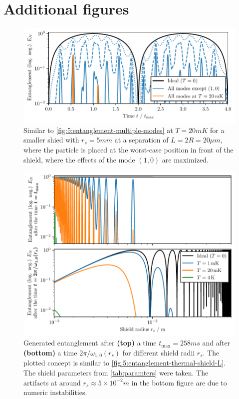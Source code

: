 \chapter{Additional figures}\label{apx:additiona-figures}
\begin{figure}[!htbp]
  \centering
  \includegraphics[width=\textwidth]{./../figures/vibrations/entanglement-dynamics-all-modes_rs-5mm.pdf}
  \caption{Similar to \cref{fig:5:entanglement-multiple-modes} at $T=20\si{mK}$ for a smaller shied with $r_s = 5\si{mm}$ at a separation of $L=2R = 20\si{\mu m}$, where the particle is placed at the worst-case position in front of the shield, where the effects of the mode $(1,0)$ are maximized.}
  \label{fig:apx:entanglement-thermal-shield-rs-5mm}
\end{figure}

\begin{figure}[!htbp]
  \centering
  \includegraphics[width=\textwidth]{./../figures/vibrations/all-modes-entanglement-rs.pdf}
  \caption{Generated entanglement after \textbf{(top)} a time $t_\mathrm{max} = 258\si{ms}$ and after \textbf{(bottom)} a time $2\pi/\omega_{1,0}(r_s)$ for different shield radii $r_s$. The plotted concept is similar to \cref{fig:5:entanglement-thermal-shield-L}. The shield parameters from \cref{tab:paramters} were taken. The artifacts at around $r_s \approx 5\times 10^{-2}\si{m}$ in the bottom figure are due to numeric instabilities.}
  \label{fig:apx:entanglement-thermal-shield-rs}
\end{figure}